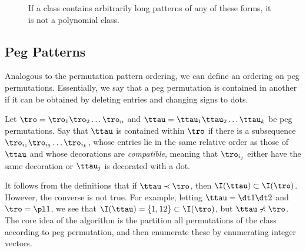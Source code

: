 \documentclass[12pt,twoside]{memoir}
\begin{document}
\begin{figure}[t]

      \caption{If a class contains arbitrarily long patterns of any of these forms,
      it is not a polynomial class.}
      \label{polyclass:fig:alternations}
      \end{figure}


    \subsection{Peg Patterns}

      Analogous to the permutation pattern ordering, we can define an ordering on
      peg permutations. Essentially, we say that a peg permutation is contained in
      another if it can be obtained by deleting entries and changing signs to dots. 


      \begin{definition} \label{polyclass:def:pegpattern}
        Let $\tro = \tro_1 \tro_2 \dots \tro_n$ and $\ttau = \ttau_1 \ttau_2 \dots
        \ttau_k$ be peg permutations. Say that $\ttau$ is contained within $\tro$ if
        there is a subsequence $\tro_{i_1} \tro_{i_2} \dots \tro_{i_k}$, whose
        entries lie in the same relative order as those of $\ttau$ and whose
        decorations are \emph{compatible}, meaning that $\tro_{i_j}$ either have
        the same decoration or $\ttau_j$ is decorated with a dot. 
      \end{definition}

      It follows from the definitions that if $\ttau \prec \tro$, then $\I(\ttau)
      \subset \I(\tro)$. However, the converse is not true. For example, letting
      $\ttau = \dt 1 \dt 2$ and $\tro = \pl 1$, we see that $\I(\ttau) = \{1, 12\}
      \subset \I(\tro)$, but $\ttau \not \prec \tro$. The core idea of the algorithm
      is the partition all permutations of the class according to peg permutation,
      and then enumerate these by enumerating integer vectors. 
\end{document}
